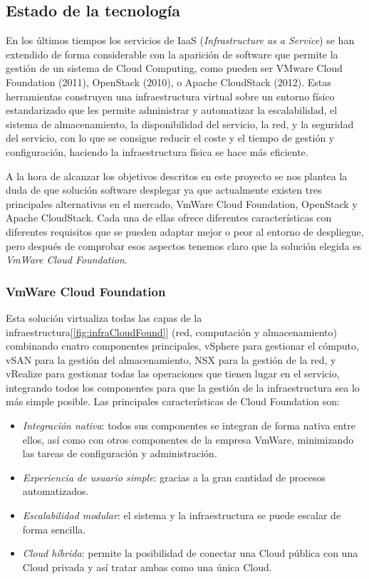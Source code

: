 \subsection{Estado de la tecnología}

En los últimos tiempos los servicios de IaaS (\textit{Infrastructure as a Service}) se han extendido de forma considerable con la aparición de software que permite la gestión de un sistema de Cloud Computing, como pueden ser VMware Cloud Foundation (2011), OpenStack (2010), o Apache CloudStack (2012). Estas herramientas construyen una infraestructura virtual sobre un entorno físico estandarizado que les permite administrar y automatizar la escalabilidad, el sistema de almacenamiento, la disponibilidad del servicio, la red, y la seguridad del servicio, con lo que se consigue reducir el coste y el tiempo de gestión y configuración, haciendo la infraestructura física se hace más eficiente.

A la hora de alcanzar los objetivos descritos en este proyecto se nos plantea la duda de que solución software desplegar ya que actualmente existen tres principales alternativas en el mercado, VmWare Cloud Foundation, OpenStack y Apache CloudStack. Cada una de ellas ofrece diferentes características con diferentes requisitos que se pueden adaptar mejor o peor al entorno de despliegue, pero después de comprobar esos aspectos tenemos claro que la solución elegida es \emph{VmWare Cloud Foundation}.

\subsubsection{VmWare Cloud Foundation}
Esta solución virtualiza todas las capas de la infraestructura[\ref{fig:infraCloudFound}] (red, computación y almacenamiento) combinando cuatro componentes principales, vSphere para gestionar el cómputo, vSAN para la gestión del almacenamiento, NSX para la gestión de la red, y vRealize para gestionar todas las operaciones que tienen lugar en el servicio, integrando todos los componentes para que la gestión de la infraestructura sea lo más simple posible. Las principales características de Cloud Foundation son:
\begin{itemize}
    \item \emph{Integración nativa}: todos sus componentes se integran de forma nativa entre ellos, así como con otros componentes de la empresa VmWare, minimizando las tareas de configuración y administración.
    \item \emph{Experiencia de usuario simple}: gracias a la gran cantidad de procesos automatizados.
    \item \emph{Escalabilidad modular}: el sistema y la infraestructura se puede escalar de forma sencilla.
    \item \emph{Cloud híbrida}: permite la posibilidad de conectar una Cloud pública con una Cloud privada y así tratar ambas como una única Cloud.
\end{itemize}

